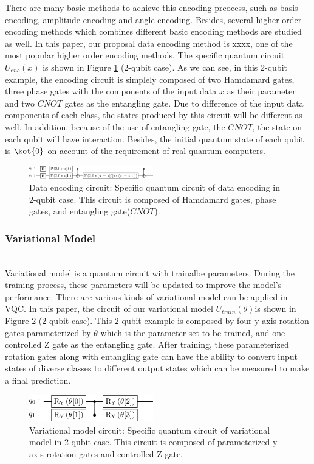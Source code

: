 \documentclass[sigconf]{acmart}
\begin{document}
There are many basic methods to achieve this encoding preocess, such as basis encoding, amplitude encoding and angle encoding. Besides, several higher order encoding methods which combines different basic encoding methods are studied as well. In this paper, our proposal data encoding method is xxxx, one of the most popular higher order encoding methods. The specific quantum circuit $U_{enc}(x)$ is shown in Figure \ref{fig:encoding} (2-qubit case). As we can see, in this 2-qubit example, the encoding circuit is simplely composed of two Hamdamard gates, three phase gates with the components of the input data $x$ as their parameter and two $CNOT$ gates as the entangling gate. Due to difference of the input data components of each class, the states produced by this circuit will be different as well. In addition, because of the use of entangling gate, the $CNOT$, the state on each qubit will have interaction. Besides, the initial quantum state of each qubit is $\ket{0}$ on account of the requirement of real quantum computers.
\begin{figure}[!ht]
	\centering
	\includegraphics[width=0.48\textwidth]{encode.png}
	\caption{Data encoding circuit: {\small \textnormal{Specific quantum circuit of data encoding in 2-qubit case. This circuit is composed of Hamdamard gates, phase gates, and entangling gate($CNOT$).}} }
	\label{fig:encoding}
\end{figure}
\subsubsection{Variational Model}\hfill\\
Variational model is a quantum circuit with trainalbe parameters. During the training process, these parameters will be updated to improve the model's performance. There are various kinds of variational model can be applied in VQC. In this paper, the circuit of our variational model $U_{train}(\theta)$is shown in Figure \ref{fig:variational} (2-qubit case). This 2-qubit example is composed by four y-axis rotation gates parameterized by $\theta$ which is the parameter set to be trained, and one controlled Z gate as the entangling gate. After training, these parameterized rotation gates along with entangling gate can have the ability to convert input states of diverse classes to different output states which can be measured to make a final prediction.   
\begin{figure}[!ht]
	\centering
	\includegraphics[width=0.48\textwidth]{vari.png}
	\caption{Variational model circuit: {\small \textnormal{Specific quantum circuit of variational model in 2-qubit case. This circuit is composed of parameterized y-axis rotation gates and controlled Z gate.}} }
	\label{fig:variational}
\end{figure}
\end{document}
